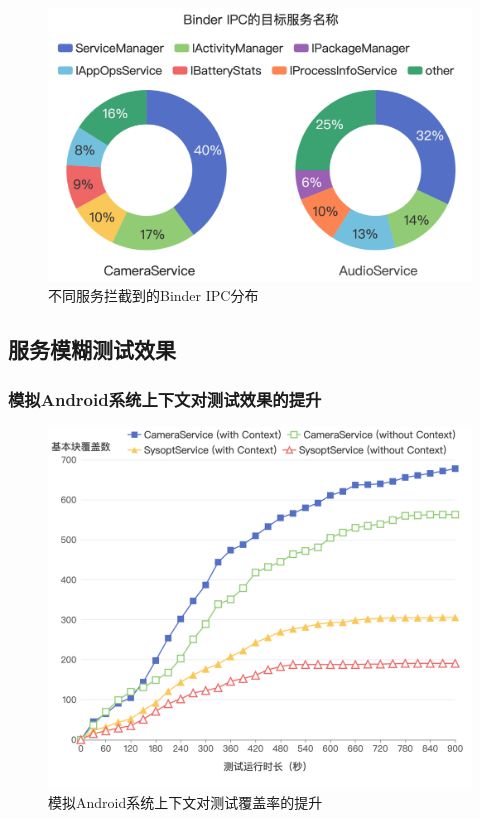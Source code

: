 \documentclass[winfonts,master,twoside]{njuthesis}
\begin{document}
\begin{figure}
	\centering
	\includegraphics[width=\textwidth]{figure/5-experiment/binder-ipc-record.png}
	\caption{不同服务拦截到的Binder IPC分布}
	\label{binder_ipc_stats}
\end{figure}

\subsection{服务模糊测试效果}

\subsubsection{模拟Android系统上下文对测试效果的提升}

\begin{figure}
	\centering
	\includegraphics[width=\textwidth]{figure/5-experiment/cov-inc-with-context.png}
	\caption{模拟Android系统上下文对测试覆盖率的提升}
	\label{coverage_with_context}
\end{figure}
\end{document}
